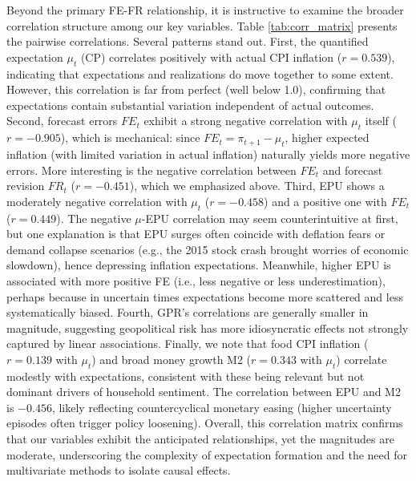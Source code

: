 \documentclass[12pt]{article}
\begin{document}
Beyond the primary FE-FR relationship, it is instructive to examine the broader correlation structure among our key variables. Table \ref{tab:corr_matrix} presents the pairwise correlations. Several patterns stand out. First, the quantified expectation $\mu_t$ (CP) correlates positively with actual CPI inflation ($r=0.539$), indicating that expectations and realizations do move together to some extent. However, this correlation is far from perfect (well below 1.0), confirming that expectations contain substantial variation independent of actual outcomes. Second, forecast errors $FE_t$ exhibit a strong negative correlation with $\mu_t$ itself ($r=-0.905$), which is mechanical: since $FE_t = \pi_{t+1} - \mu_t$, higher expected inflation (with limited variation in actual inflation) naturally yields more negative errors. More interesting is the negative correlation between $FE_t$ and forecast revision $FR_t$ ($r=-0.451$), which we emphasized above. Third, EPU shows a moderately negative correlation with $\mu_t$ ($r=-0.458$) and a positive one with $FE_t$ ($r=0.449$). The negative $\mu$-EPU correlation may seem counterintuitive at first, but one explanation is that EPU surges often coincide with deflation fears or demand collapse scenarios (e.g., the 2015 stock crash brought worries of economic slowdown), hence depressing inflation expectations. Meanwhile, higher EPU is associated with more positive FE (i.e., less negative or less underestimation), perhaps because in uncertain times expectations become more scattered and less systematically biased. Fourth, GPR's correlations are generally smaller in magnitude, suggesting geopolitical risk has more idiosyncratic effects not strongly captured by linear associations. Finally, we note that food CPI inflation ($r=0.139$ with $\mu_t$) and broad money growth M2 ($r=0.343$ with $\mu_t$) correlate modestly with expectations, consistent with these being relevant but not dominant drivers of household sentiment. The correlation between EPU and M2 is $-0.456$, likely reflecting countercyclical monetary easing (higher uncertainty episodes often trigger policy loosening). Overall, this correlation matrix confirms that our variables exhibit the anticipated relationships, yet the magnitudes are moderate, underscoring the complexity of expectation formation and the need for multivariate methods to isolate causal effects.
\end{document}
